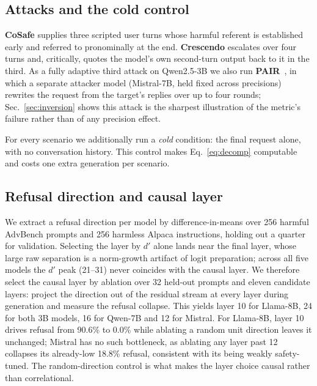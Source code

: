 \documentclass[10pt,twocolumn]{article}
\begin{document}
\subsection{Attacks and the cold control}
\textbf{CoSafe} supplies three scripted user turns whose harmful referent is
established early and referred to pronominally at the end. \textbf{Crescendo}
escalates over four turns and, critically, quotes the model's own second-turn
output back to it in the third. As a fully adaptive third attack on Qwen2.5-3B we
also run \textbf{PAIR}~\citep{chao2023jailbreaking}, in which a separate attacker
model (Mistral-7B, held fixed across precisions) rewrites the request from the
target's replies over up to four rounds; Sec.~\ref{sec:inversion} shows this
attack is the sharpest illustration of the metric's failure rather than of any
precision effect.

For every scenario we additionally run a \emph{cold} condition: the final
request alone, with no conversation history. This control makes
Eq.~\ref{eq:decomp} computable and costs one extra generation per scenario.

\subsection{Refusal direction and causal layer}
We extract a refusal direction per model by difference-in-means over 256 harmful
AdvBench prompts and 256 harmless Alpaca instructions, holding out a quarter for
validation. Selecting the layer by $d'$ alone lands near the final layer, whose
large raw separation is a norm-growth artifact of logit preparation; across all
five models the $d'$ peak (21--31) never coincides with the causal layer.
We therefore select the causal layer by ablation over 32 held-out prompts and
eleven candidate layers: project the direction out of the residual stream at
every layer during generation and measure the refusal collapse. This yields
layer 10 for Llama-8B, 24 for both 3B models, 16 for Qwen-7B and 12 for Mistral.
For Llama-8B, layer 10 drives refusal from 90.6\% to 0.0\% while ablating a random
unit direction leaves it unchanged; Mistral has no such bottleneck, as ablating
any layer past 12 collapses its already-low 18.8\% refusal, consistent with its
being weakly safety-tuned. The random-direction control is what makes the layer
choice causal rather than correlational.
\end{document}
